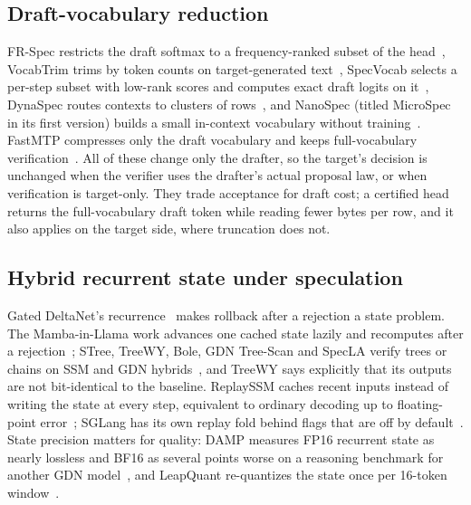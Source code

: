 \subsection{Draft-vocabulary reduction}
FR-Spec restricts the draft softmax to a frequency-ranked subset of the head~\cite{frspec}, VocabTrim trims by token counts on target-generated text~\cite{vocabtrim}, SpecVocab selects a per-step subset with low-rank scores and computes exact draft logits on it~\cite{specvocab}, DynaSpec routes contexts to clusters of rows~\cite{dynaspec}, and NanoSpec (titled MicroSpec in its first version) builds a small in-context vocabulary without training~\cite{microspec}. FastMTP compresses only the draft vocabulary and keeps full-vocabulary verification~\cite{fastmtp}. All of these change only the drafter, so the target's decision is unchanged when the verifier uses the drafter's actual proposal law, or when verification is target-only. They trade acceptance for draft cost; a certified head returns the full-vocabulary draft token while reading fewer bytes per row, and it also applies on the target side, where truncation does not.

\subsection{Hybrid recurrent state under speculation}
Gated DeltaNet's recurrence~\cite{gdn,deltanet} makes rollback after a rejection a state problem. The Mamba-in-Llama work advances one cached state lazily and recomputes after a rejection~\cite{mambainllama}; STree, TreeWY, Bole, GDN Tree-Scan and SpecLA verify trees or chains on SSM and GDN hybrids~\cite{stree,treewy,bole,gdntreescan,specla}, and TreeWY says explicitly that its outputs are not bit-identical to the baseline. ReplaySSM caches recent inputs instead of writing the state at every step, equivalent to ordinary decoding up to floating-point error~\cite{replayssm}; SGLang has its own replay fold behind flags that are off by default~\cite{gdncode}. State precision matters for quality: DAMP measures FP16 recurrent state as nearly lossless and BF16 as several points worse on a reasoning benchmark for another GDN model~\cite{damp}, and LeapQuant re-quantizes the state once per 16-token window~\cite{leapquant}.

